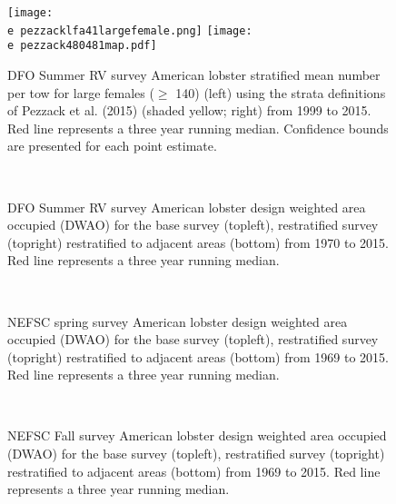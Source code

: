 \documentclass[11pt]{article}
\newcommand{\e}{/backup/bio_data/bio.lobster/figures/} %
\begin{document}
\begin{landscape}
\begin{figure}
\centering
    \texttt{[image: \\e pezzacklfa41largefemale.png]} 
    \texttt{[image: \\e pezzack480481map.pdf]} 
    
    \caption{DFO Summer RV survey American lobster stratified mean number per tow for large females ($\geq$ 140) (left) using the strata definitions of Pezzack et al. (2015) (shaded yellow; right) from 1999 to 2015. Red line represents a three year running median. Confidence bounds are presented for each point estimate.}

\end{figure}
\end{landscape}


\begin{figure}
\centering
{}
\\
\caption{DFO Summer RV survey American lobster design weighted area occupied (DWAO) for the base survey (topleft), restratified survey (topright) restratified to adjacent areas (bottom) from 1970 to 2015. Red line represents a three year running median.}
\end{figure}
\clearpage


\begin{figure}
\centering
{}
\\
\caption{NEFSC spring survey American lobster design weighted area occupied (DWAO) for the base survey (topleft), restratified survey (topright) restratified to adjacent areas (bottom) from 1969 to 2015. Red line represents a three year running median. }
\end{figure}
\clearpage


\begin{figure}
\centering
{}
\\
\caption{NEFSC Fall survey American lobster design weighted area occupied (DWAO) for the base survey (topleft), restratified survey (topright) restratified to adjacent areas (bottom) from 1969 to 2015. Red line represents a three year running median. }
\end{figure}
\clearpage
\end{document}
